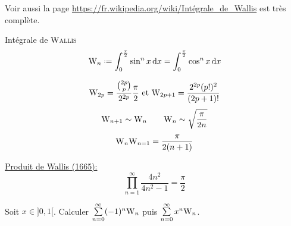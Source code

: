 Voir  aussi la page \url{https://fr.wikipedia.org/wiki/Intégrale_de_Wallis} est très complète. 

\begin{defi}{Intégrale de \textsc{Wallis}}
    $$\Wallis_n \defeq \int_{0}^{\frac{\pi}{2}} \sin^n x \d x = \int_{0}^{\frac{\pi}{2}} \cos^n x \d x$$
\end{defi}

\begin{prop}{}
    $$\mathrm{W}_{2p} = \frac{\binom{2p}{p}}{2^{2p}}\frac{\pi}{2} \text{ et } \mathrm{W}_{2p+1} = \frac{2^{2p} (p!)^2}{(2p+1)!}$$
    $$\mathrm{W}_{n+1} \sim \mathrm{W}_n \qquad \mathrm{W}_n \sim \sqrt{\frac{\pi}{2n}}$$
    $$\mathrm{W}_n \mathrm{W}_{n=1} = \frac{\pi}{2(n+1)}$$
\end{prop}

\underline{Produit de Wallis (1665):}
$$\prod_{n=1}^{\infty} \frac{4n^2}{4n^2-1} = \frac{\pi}{2}$$

\begin{exercice}
    Soit $x \in ]0,1[$. Calculer $\sum\limits_{n=0}^\infty (-1)^n \mathrm{W}_n$ puis $\sum\limits_{n=0}^\infty x^n \mathrm{W}_n$.
\end{exercice}
